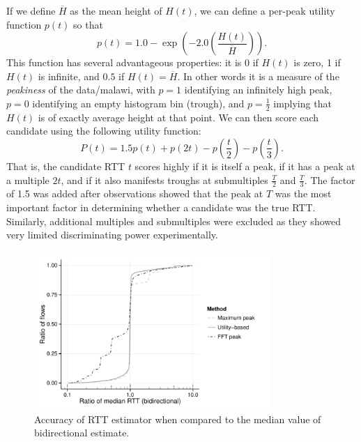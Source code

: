 If we define $\overline{H}$ as the mean height of $H(t)$, we can define a per-peak utility function $p(t)$ so that 
\begin{equation*}
p(t) = 1.0 - \exp\left(-2.0 \left(\frac{H(t)}{\overline{H}}\right)\right) \mbox{.}
\end{equation*}
This function has several advantageous properties: it is 0 if $H(t)$ is zero, 1
if $H(t)$ is infinite, and $0.5$ if $H(t) = \overline{H}$.  In other
words it is a measure of the \emph{peakiness} of the data/malawi, with $p=1$ identifying
an infinitely high peak, $p=0$ identifying an empty histogram bin (trough), and $p=\frac{1}{2}$ 
implying that $H(t)$ is of exactly average height at that point. We can then score each candidate using the following utility function:
$$
P(t) = 1.5 p(t) + p(2t) - p\left(\frac{t}{2}\right) - p\left(\frac{t}{3}\right).
$$
That is, the candidate RTT $t$ scores highly if it is itself a peak, if it has a peak
at a multiple $2t$, and if it also manifests troughs at submultiples $\frac{T}{2}$ and $\frac{T}{3}$.
The factor of 1.5 was added after observations
showed that the peak at $T$ was the most important factor in determining
whether a candidate was the true RTT. Similarly, additional multiples and submultiples 
were excluded as they showed very limited discriminating power experimentally.

\begin{figure}
  \centering
  \includegraphics[width=0.8\textwidth]{figures/malawi/rttcomp.pdf}
  \caption{Accuracy of RTT estimator when compared to the median value of bidirectional estimate.}
\end{figure}

